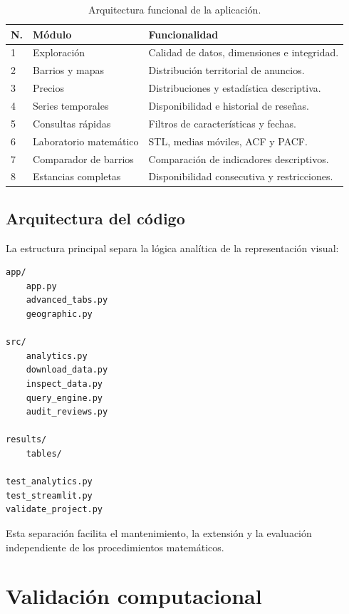 \documentclass[11pt,a4paper]{article}
\begin{document}
\begin{table}[H]
\centering
\caption{Arquitectura funcional de la aplicación.}
\begin{tabularx}{\textwidth}{
p{}
p{}
X}
\toprule
N. & Módulo & Funcionalidad\\
\midrule
1 & Exploración &
Calidad de datos, dimensiones e integridad.\\
2 & Barrios y mapas &
Distribución territorial de anuncios.\\
3 & Precios &
Distribuciones y estadística descriptiva.\\
4 & Series temporales &
Disponibilidad e historial de reseñas.\\
5 & Consultas rápidas &
Filtros de características y fechas.\\
6 & Laboratorio matemático &
STL, medias móviles, ACF y PACF.\\
7 & Comparador de barrios &
Comparación de indicadores descriptivos.\\
8 & Estancias completas &
Disponibilidad consecutiva y restricciones.\\
\bottomrule
\end{tabularx}
\end{table}

\subsection{Arquitectura del código}

La estructura principal separa la lógica analítica
de la representación visual:

\begin{verbatim}
app/
    app.py
    advanced_tabs.py
    geographic.py

src/
    analytics.py
    download_data.py
    inspect_data.py
    query_engine.py
    audit_reviews.py

results/
    tables/

test_analytics.py
test_streamlit.py
validate_project.py
\end{verbatim}

Esta separación facilita el mantenimiento,
la extensión y la evaluación independiente
de los procedimientos matemáticos.


\section{Validación computacional}
\end{document}
